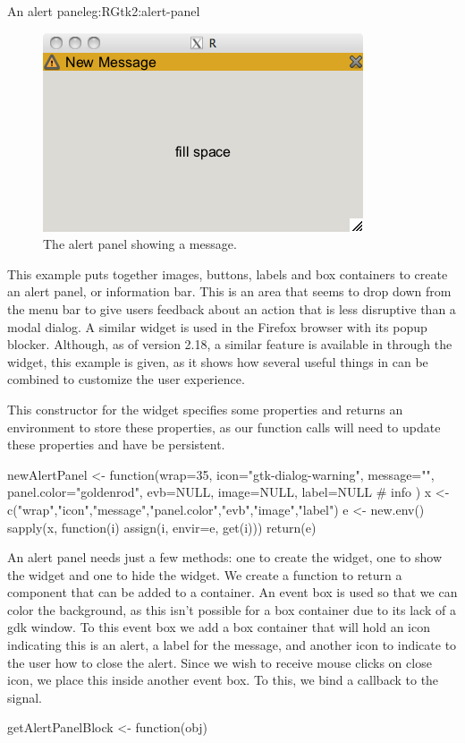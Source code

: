 \begin{example}{An alert panel}{eg:RGtk2:alert-panel}

\begin{figure}
  \centering
  \includegraphics[width=.45\textwidth]{ex-RGtk2-alert-panel}
  \caption{The alert panel showing a message.}
  \label{fig:RGtk2-alert-panel}
\end{figure}

This example puts together images, buttons, labels and box containers
to create an alert panel, or information bar. This is an area that
seems to drop down from the menu bar to give users feedback about an
action that is less disruptive than a modal dialog. A similar widget
is used in the Firefox browser with its popup blocker. Although, as of version
2.18, a similar feature is available in \GTK\/ through the
 widget, this example is given, as it shows how
several useful things in \GTK\/ can be combined to customize the user
experience.

This constructor for the widget specifies some properties and returns
an environment to store these properties, as our function calls will
need to update these properties and have be persistent.
\begin{Schunk}
\begin{Sinput}
 newAlertPanel <- function(wrap=35,
                           icon="gtk-dialog-warning",
                           message="",
                           panel.color="goldenrod",
                           evb=NULL,
                           image=NULL,
                           label=NULL # info
                     ) {
   x <- c("wrap","icon","message","panel.color","evb","image","label")
   e <- new.env()
   sapply(x, function(i) assign(i, envir=e, get(i)))
   return(e)
 }
\end{Sinput}
\end{Schunk}

An alert panel needs just a few methods: one to create the widget, one
to show the widget and one to hide the widget. We create a function
 to return a component that can be added to a
container. An event box is used so that we can color the background,
as this isn't possible for a box container due to its lack of a gdk
window.  To this event box we add a box container that will hold an
icon indicating this is an alert, a label for the message, and another
icon to indicate to the user how to close the alert. Since we wish to
receive mouse clicks on close icon, we place this inside another event
box. To this, we bind a callback to the  signal.
\begin{Schunk}
\begin{Sinput}
 getAlertPanelBlock <- function(obj) {
 
}
\end{Sinput}
\end{Schunk}
\end{example}
